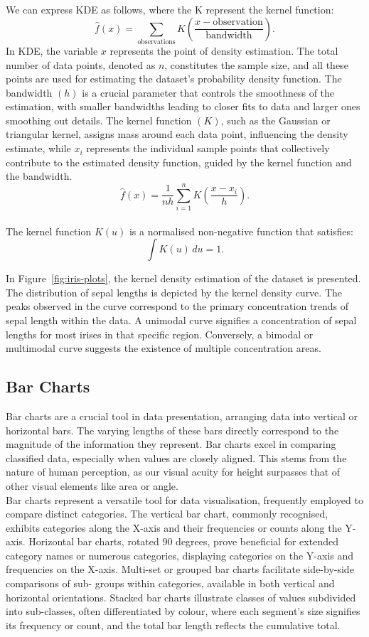 \documentclass{article}\usepackage[]{graphicx}\usepackage[]{xcolor}
\numberwithin{equation}{section}
\begin{document}
\noindent
We can express KDE as follows, where the K represent the kernel function:
$$\hat{f}(x) = \sum_{\text{observations}} K\left(\frac{x - \text{observation}}{\text{bandwidth}}\right).$$
In KDE, the variable $x$ represents the point of density estimation. The total number of data points, denoted as $n$, constitutes the sample size, and all these points are used for estimating the dataset's probability density function. The bandwidth $(h)$ is a crucial parameter that controls the smoothness of the estimation, with smaller bandwidths leading to closer fits to data and larger ones smoothing out details. The kernel function $(K)$, such as the Gaussian or triangular kernel, assigns mass around each data point, influencing the density estimate, while $x_i$ represents the individual sample points that collectively contribute to the estimated density function, guided by the kernel function and the bandwidth\cite{wand1994kernel}.
$$\hat{f}(x) = \frac{1}{nh} \sum_{i=1}^{n} K\left(\frac{x - x_i}{h}\right).$$\\
The kernel function \( K(u) \) is a normalised non-negative function that satisfies:
\[ \int K(u) \, du = 1. \]

\noindent In Figure~\ref{fig:iris-plots}, the kernel density estimation of the dataset is presented. The distribution of sepal lengths is depicted by the kernel density curve. The peaks observed in the curve correspond to the primary concentration trends of sepal length within the data. A unimodal curve signifies a concentration of sepal lengths for most irises in that specific region. Conversely, a bimodal or multimodal curve suggests the existence of multiple concentration areas.

\subsection{Bar Charts}
\noindent Bar charts are a crucial tool in data presentation, arranging data into vertical or horizontal bars. The varying lengths of these bars directly correspond to the magnitude of the information they represent. Bar charts excel in comparing classified data, especially when values are closely aligned. This stems from the nature of human perception, as our visual acuity for height surpasses that of other visual elements like area or angle.\\

\noindent Bar charts represent a versatile tool for data visualisation, frequently employed to compare distinct categories. The vertical bar chart, commonly recognised, exhibits categories along the X-axis and their frequencies or counts along the Y-axis. Horizontal bar charts, rotated 90 degrees, prove beneficial for extended category names or numerous categories, displaying categories on the Y-axis and frequencies on the X-axis. Multi-set or grouped bar charts facilitate side-by-side comparisons of sub- groups within categories, available in both vertical and horizontal orientations. Stacked bar charts illustrate classes of values subdivided into sub-classes, often differentiated by colour, where each segment's size signifies its frequency or count, and the total bar length reflects the cumulative total.\\
\end{document}
